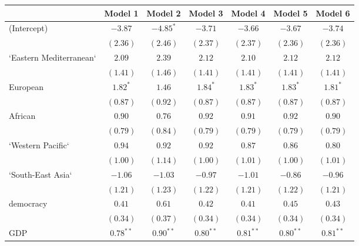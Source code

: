 
\begin{table}[!h]
\begin{center}
\begin{tabular}{l c c c c c c }
\toprule
 & Model 1 & Model 2 & Model 3 & Model 4 & Model 5 & Model 6 \\
\midrule
(Intercept)             & $-3.87$      & $-4.85^{*}$  & $-3.71$      & $-3.66$      & $-3.67$      & $-3.74$      \\
                        & $(2.36)$     & $(2.46)$     & $(2.37)$     & $(2.37)$     & $(2.36)$     & $(2.36)$     \\
`Eastern Mediterranean` & $2.09$       & $2.39$       & $2.12$       & $2.10$       & $2.12$       & $2.12$       \\
                        & $(1.41)$     & $(1.46)$     & $(1.41)$     & $(1.41)$     & $(1.41)$     & $(1.41)$     \\
European                & $1.82^{*}$   & $1.46$       & $1.84^{*}$   & $1.83^{*}$   & $1.83^{*}$   & $1.81^{*}$   \\
                        & $(0.87)$     & $(0.92)$     & $(0.87)$     & $(0.87)$     & $(0.87)$     & $(0.87)$     \\
African                 & $0.90$       & $0.76$       & $0.92$       & $0.91$       & $0.92$       & $0.90$       \\
                        & $(0.79)$     & $(0.84)$     & $(0.79)$     & $(0.79)$     & $(0.79)$     & $(0.79)$     \\
`Western Pacific`       & $0.94$       & $0.92$       & $0.92$       & $0.87$       & $0.86$       & $0.80$       \\
                        & $(1.00)$     & $(1.14)$     & $(1.00)$     & $(1.01)$     & $(1.00)$     & $(1.01)$     \\
`South-East Asia`       & $-1.06$      & $-1.03$      & $-0.97$      & $-1.01$      & $-0.86$      & $-0.96$      \\
                        & $(1.21)$     & $(1.23)$     & $(1.22)$     & $(1.21)$     & $(1.22)$     & $(1.21)$     \\
democracy               & $0.41$       & $0.61$       & $0.42$       & $0.41$       & $0.45$       & $0.43$       \\
                        & $(0.34)$     & $(0.37)$     & $(0.34)$     & $(0.34)$     & $(0.34)$     & $(0.34)$     \\
GDP                     & $0.78^{**}$  & $0.90^{**}$  & $0.80^{**}$  & $0.81^{**}$  & $0.80^{**}$  & $0.81^{**}$  \\

\end{tabular}
\end{center}
\end{table}
